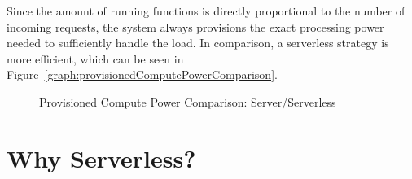 Since the amount of running functions is directly proportional to the number of incoming requests, the system always provisions the exact processing power needed to sufficiently handle the load. In comparison, a serverless strategy is more efficient, which can be seen in Figure~\vref{graph:provisionedComputePowerComparison}.

\begin{figure}[ht]
    \centering
    \caption {Provisioned Compute Power Comparison: Server/Serverless}
    \label{graph:provisionedComputePowerComparison}
\end{figure}

\section{Why Serverless?}

